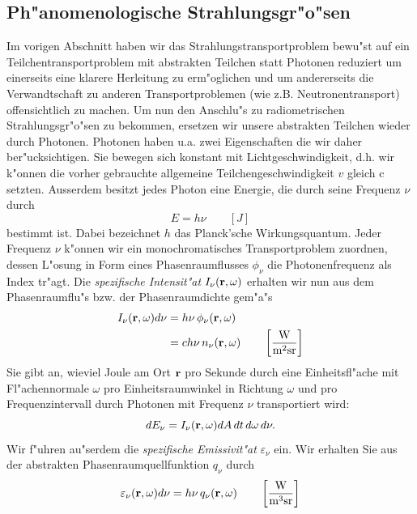 \documentclass[11pt,a4paper,DIVcalc,BCOR8mm,titlepage,twoside]{scrartcl}
\begin{document}
	\subsection{Ph"anomenologische Strahlungsgr"o"sen}
	Im vorigen Abschnitt haben wir das Strahlungstransportproblem bewu"st auf ein Teilchentransportproblem mit abstrakten Teilchen statt Photonen reduziert um einerseits eine klarere Herleitung zu erm"oglichen und um andererseits die Verwandtschaft zu anderen Transportproblemen (wie z.B. Neutronentransport) offensichtlich zu machen. Um nun den Anschlu"s zu radiometrischen Strahlungsgr"o"sen zu bekommen, ersetzen wir unsere abstrakten Teilchen wieder durch Photonen. Photonen haben u.a. zwei Eigenschaften die wir daher ber"ucksichtigen. Sie bewegen sich konstant mit Lichtgeschwindigkeit, d.h. wir k"onnen die vorher gebrauchte allgemeine Teilchengeschwindigkeit $v$ gleich $\text{c}$ setzten. Ausserdem besitzt jedes Photon eine Energie, die durch seine Frequenz $\nu$ durch 
	$$E=h\nu \qquad[J]$$
	bestimmt ist. Dabei bezeichnet $h$ das Planck'sche Wirkungsquantum.
	Jeder Frequenz $\nu$ k"onnen wir ein monochromatisches Transportproblem zuordnen, dessen L"osung in Form eines Phasenraumflusses $\phi_\nu$ die Photonenfrequenz als Index tr"agt.
	Die {\em spezifische Intensit"at} $I_\nu(\mathbf{r},\omega)$ erhalten wir nun aus dem Phasenraumflu"s bzw. der Phasenraumdichte gem"a"s
	\begin{align}\label{eq:intensity_def}
		I_\nu(\mathbf{r},\omega)d\nu & = h\nu\,\phi_\nu(\mathbf{r},\omega)\\
		                       & = c h\nu\,n_\nu(\mathbf{r},\omega) \qquad \left[\frac{\text{W}}{\text{m}^2\text{sr}}\right] \nonumber
	\end{align}
	Sie gibt an, wieviel Joule am Ort $\mathbf{r}$ pro Sekunde durch eine Einheitsfl"ache mit Fl"achennormale $\omega$ pro Einheitsraumwinkel in Richtung $\omega$ und pro Frequenzintervall durch Photonen mit Frequenz $\nu$ transportiert wird:
	$$dE_\nu=I_\nu(\mathbf{r},\omega) dA\,dt\,d\omega\,d\nu.$$
	Wir f"uhren au"serdem die {\em spezifische Emissivit"at} $\varepsilon_\nu$ ein. Wir erhalten Sie aus der abstrakten Phasenraumquellfunktion $q_\nu$ durch
	\begin{equation}\label{eq:emissivity_def}
		\varepsilon_\nu(\mathbf{r},\omega)d\nu = h\nu\,q_\nu(\mathbf{r},\omega) \qquad \left[\frac{\text{W}}{\text{m}^3\text{sr}}\right]
	\end{equation}
	
\end{document}
